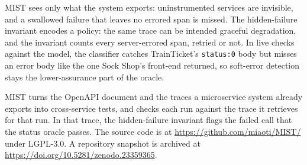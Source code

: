 \documentclass[10pt,conference]{IEEEtran}
\begin{document}
MIST sees only what the system exports: uninstrumented services are invisible, and a swallowed failure that leaves no errored span is missed. The hidden-failure invariant encodes a policy: the same trace can be intended graceful degradation, and the invariant counts every server-errored span, retried or not. In live checks against the model, the classifier catches TrainTicket's \texttt{status:0} body but misses an error body like the one Sock Shop's front-end returned, so soft-error detection stays the lower-assurance part of the oracle.

MIST turns the OpenAPI document and the traces a microservice system already exports into cross-service tests, and checks each run against the trace it retrieves for that run. In that trace, the hidden-failure invariant flags the failed call that the status oracle passes. The source code is at \url{https://github.com/miaoti/MIST/} under LGPL-3.0. A repository snapshot is archived at \url{https://doi.org/10.5281/zenodo.23359365}.


\end{document}
